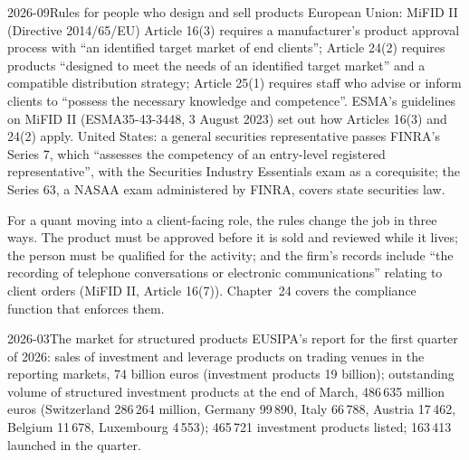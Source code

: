 \begin{dated}{2026-09}{Rules for people who design and sell products}\label{dat:in:structurer-sales-and-sales-trader:rules}
European Union: MiFID II (Directive 2014/65/EU) Article 16(3) requires a manufacturer's product approval process with ``an
identified target market of end clients''; Article 24(2) requires products ``designed to meet the needs of an identified
target market'' and a compatible distribution strategy; Article 25(1) requires staff who advise or inform clients to
``possess the necessary knowledge and competence''. ESMA's guidelines on MiFID II  (ESMA35-43-3448, 3
August 2023) set out how Articles 16(3) and 24(2) apply. United States: a general securities representative passes
FINRA's Series 7, which ``assesses the competency of an entry-level registered representative'', with the Securities
Industry Essentials exam as a corequisite; the Series 63, a NASAA exam administered by FINRA, covers state securities law.
\end{dated}

For a quant moving into a client-facing role, the rules change the job in three ways. The product must be approved
before it is sold and reviewed while it lives; the person must be qualified for the activity; and the firm's records
include ``the recording of telephone conversations or electronic communications'' relating to client orders (MiFID II,
Article 16(7)). Chapter~24 covers the compliance function that enforces them.

\begin{dated}{2026-03}{The market for structured products}\label{dat:in:structurer-sales-and-sales-trader:market}
EUSIPA's report for the first quarter of 2026: sales of investment and leverage products on trading venues in the
reporting markets, 74 billion euros (investment products 19 billion); outstanding volume of structured investment products
at the end of March, 486\,635 million euros (Switzerland 286\,264 million, Germany 99\,890, Italy 66\,788, Austria
17\,462, Belgium 11\,678, Luxembourg 4\,553); 465\,721 investment products listed; 163\,413 launched in the quarter.
\end{dated}

